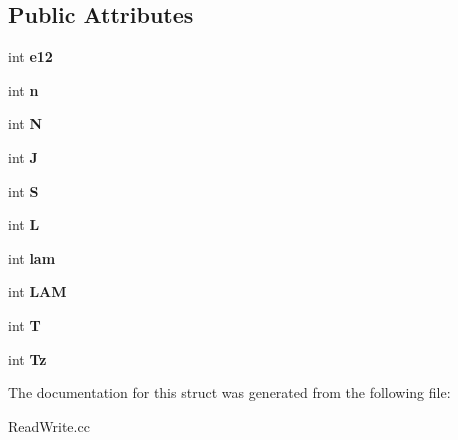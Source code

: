 \subsection*{Public Attributes}
\begin{DoxyCompactItemize}
\item 
\mbox{\label{structjavier__state__t_a1c911752e3a3439f6f92070fbceacef9}} 
int {\bfseries e12}
\item 
\mbox{\label{structjavier__state__t_a62cfcf5b7aec707cff276003eb816a16}} 
int {\bfseries n}
\item 
\mbox{\label{structjavier__state__t_a5e4066e2c6aa782771a36e0695e884d5}} 
int {\bfseries N}
\item 
\mbox{\label{structjavier__state__t_a04f6b764baff538e45f95b68c7f9f088}} 
int {\bfseries J}
\item 
\mbox{\label{structjavier__state__t_a8ba1f094b299bb85181122bd5fce202d}} 
int {\bfseries S}
\item 
\mbox{\label{structjavier__state__t_a6158eaee4561ee8b11d8d65dc2f4e346}} 
int {\bfseries L}
\item 
\mbox{\label{structjavier__state__t_a04435bb0a79131787060e08c19766209}} 
int {\bfseries lam}
\item 
\mbox{\label{structjavier__state__t_ad0a2b28a95af63779d0bbe2625a9a4ed}} 
int {\bfseries L\+AM}
\item 
\mbox{\label{structjavier__state__t_ac001f15381412758bfa2815b934ec6b2}} 
int {\bfseries T}
\item 
\mbox{\label{structjavier__state__t_a4a25233c4927d6cd122cd6fe8bb92a4f}} 
int {\bfseries Tz}
\end{DoxyCompactItemize}


The documentation for this struct was generated from the following file\+:\begin{DoxyCompactItemize}
\item 
Read\+Write.\+cc\end{DoxyCompactItemize}
